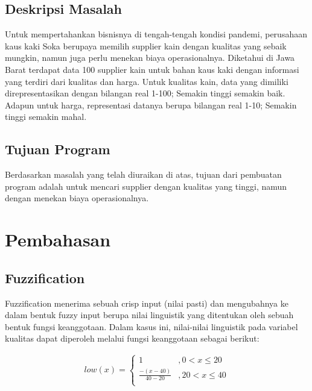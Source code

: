 \documentclass[11pt]{report}
\begin{document}
        \section{Deskripsi Masalah}
            Untuk mempertahankan bisnisnya di tengah-tengah kondisi pandemi, perusahaan kaus kaki Soka berupaya memilih supplier kain dengan kualitas yang sebaik mungkin, namun juga perlu menekan biaya operasionalnya. Diketahui di Jawa Barat terdapat data 100 supplier kain untuk bahan kaus kaki dengan informasi yang terdiri dari kualitas dan harga. Untuk kualitas kain, data yang dimiliki direpresentasikan dengan bilangan real 1-100; Semakin tinggi semakin baik. Adapun untuk harga, representasi datanya berupa bilangan real 1-10; Semakin tinggi semakin mahal.

        \section{Tujuan Program}
            Berdasarkan masalah yang telah diuraikan di atas, tujuan dari pembuatan program adalah untuk mencari supplier dengan kualitas yang tinggi, namun dengan menekan biaya operasionalnya.

    \chapter{Pembahasan}
    
    \section{Fuzzification}
        Fuzzification menerima sebuah crisp input (nilai pasti) dan mengubahnya ke dalam bentuk fuzzy input berupa nilai linguistik yang ditentukan oleh sebuah bentuk fungsi keanggotaan. Dalam kasus ini, nilai-nilai linguistik pada variabel kualitas dapat diperoleh melalui fungsi keanggotaan sebagai berikut:

        \begin{equation}
            \begin{split}
                low(x) = \begin{cases}
                    1 &, 0 < x \le 20 \\
                    \frac{-(x - 40)}{40-20} &, 20 < x \le 40 \\
                \end{cases}
            \end{split}
        \end{equation}
\end{document}
